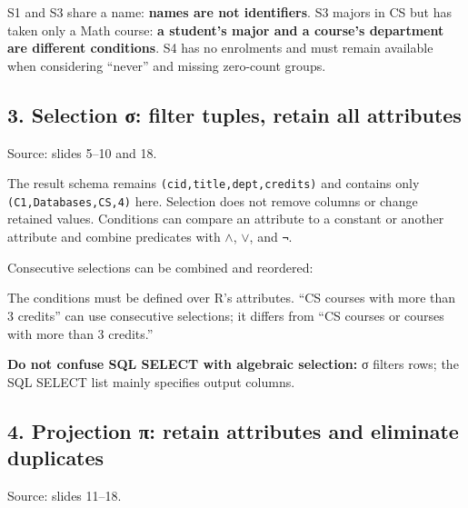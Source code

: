 S1 and S3 share a name: \textbf{names are not identifiers}. S3 majors in CS but has taken only a Math course: \textbf{a student's major and a course's department are different conditions}. S4 has no enrolments and must remain available when considering ``never'' and missing zero-count groups.

\Needspace{11cm}
\subsection{3. Selection σ: filter tuples, retain all attributes}\label{05_relational_algebra_en-selection-ux3c3-filter-tuples-retain-all-attributes}


Source: slides 5--10 and 18.


The result schema remains \texttt{(\allowbreak{}cid,\allowbreak{}title,\allowbreak{}dept,\allowbreak{}credits)\allowbreak{}} and contains only \texttt{(\allowbreak{}C1,\allowbreak{}Databases,\allowbreak{}CS,\allowbreak{}4)\allowbreak{}} here. Selection does not remove columns or change retained values. Conditions can compare an attribute to a constant or another attribute and combine predicates with \(\land \), \(\lor \), and \texttt{¬}.

Consecutive selections can be combined and reordered:


The conditions must be defined over R's attributes. ``CS courses with more than 3 credits'' can use consecutive selections; it differs from ``CS courses or courses with more than 3 credits.''

\textbf{Do not confuse SQL SELECT with algebraic selection:} σ filters rows; the SQL SELECT list mainly specifies output columns.

\subsection{4. Projection π: retain attributes and eliminate duplicates}\label{05_relational_algebra_en-projection-ux3c0-retain-attributes-and-eliminate-duplicates}

Source: slides 11--18.


